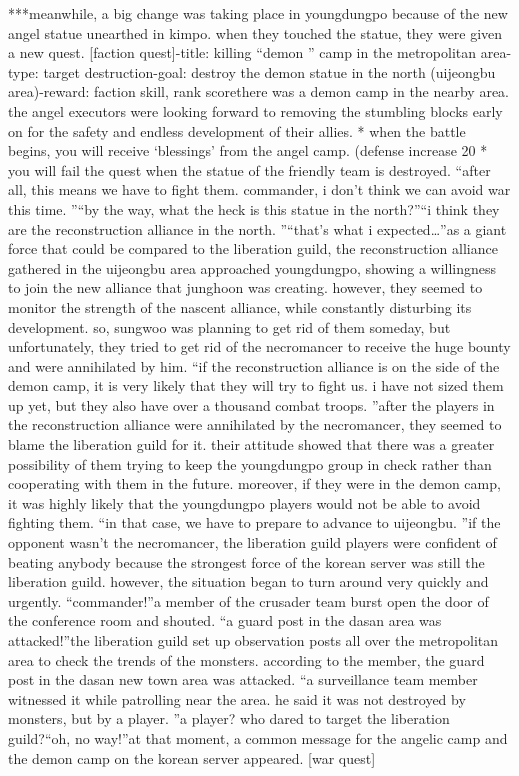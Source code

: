 ***meanwhile, a big change was taking place in youngdungpo because of the new angel statue unearthed in kimpo.
 when they touched the statue, they were given a new quest.
[faction quest]-title: killing “demon ” camp in the metropolitan area-type: target destruction-goal: destroy the demon statue in the north (uijeongbu area)-reward: faction skill, rank scorethere was a demon camp in the nearby area.
 the angel executors were looking forward to removing the stumbling blocks early on for the safety and endless development of their allies.
* when the battle begins, you will receive ‘blessings’ from the angel camp.
 (defense increase 20%
* you will fail the quest when the statue of the friendly team is destroyed.
“after all, this means we have to fight them.
 commander, i don’t think we can avoid war this time.
”“by the way, what the heck is this statue in the north?”“i think they are the reconstruction alliance in the north.
”“that’s what i expected…”as a giant force that could be compared to the liberation guild, the reconstruction alliance gathered in the uijeongbu area approached youngdungpo, showing a willingness to join the new alliance that junghoon was creating.
however, they seemed to monitor the strength of the nascent alliance, while constantly disturbing its development.
 so, sungwoo was planning to get rid of them someday, but unfortunately, they tried to get rid of the necromancer to receive the huge bounty and were annihilated by him.
“if the reconstruction alliance is on the side of the demon camp, it is very likely that they will try to fight us.
 i have not sized them up yet, but they also have over a thousand combat troops.
”after the players in the reconstruction alliance were annihilated by the necromancer, they seemed to blame the liberation guild for it.
 their attitude showed that there was a greater possibility of them trying to keep the youngdungpo group in check rather than cooperating with them in the future.
 moreover, if they were in the demon camp, it was highly likely that the youngdungpo players would not be able to avoid fighting them.
“in that case, we have to prepare to advance to uijeongbu.
”if the opponent wasn’t the necromancer, the liberation guild players were confident of beating anybody because the strongest force of the korean server was still the liberation guild.
however, the situation began to turn around very quickly and urgently.
“commander!”a member of the crusader team burst open the door of the conference room and shouted.
“a guard post in the dasan area was attacked!”the liberation guild set up observation posts all over the metropolitan area to check the trends of the monsters.
 according to the member, the guard post in the dasan new town area was attacked.
“a surveillance team member witnessed it while patrolling near the area.
 he said it was not destroyed by monsters, but by a player.
”a player? who dared to target the liberation guild?“oh, no way!”at that moment, a common message for the angelic camp and the demon camp on the korean server appeared.
[war quest]

